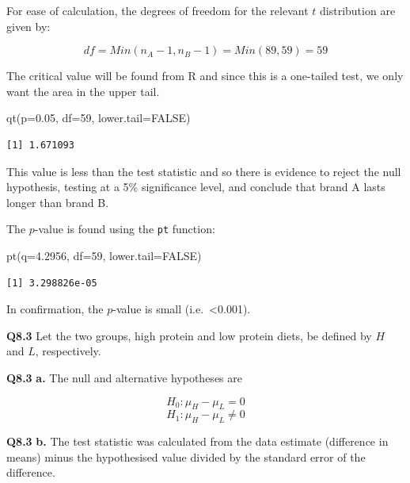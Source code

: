 \documentclass[
  oneside]{krantz}
\newenvironment{Shaded}{\begin{snugshade}}{\end{snugshade}}
\newcommand{\AttributeTok}[1]{\textcolor[rgb]{0.77,0.63,0.00}{#1}}
\newcommand{\ConstantTok}[1]{\textcolor[rgb]{0.00,0.00,0.00}{#1}}
\newcommand{\DecValTok}[1]{\textcolor[rgb]{0.00,0.00,0.81}{#1}}
\newcommand{\FloatTok}[1]{\textcolor[rgb]{0.00,0.00,0.81}{#1}}
\newcommand{\FunctionTok}[1]{\textcolor[rgb]{0.00,0.00,0.00}{#1}}
\newcommand{\NormalTok}[1]{#1}
\begin{document}
For ease of calculation, the degrees of freedom for the relevant \(t\) distribution are given by:

\[df = Min(n_A - 1, n_B - 1) = Min(89, 59) = 59\]

The critical value will be found from R and since this is a one-tailed test, we only want the area in the upper tail.

\begin{Shaded}
\begin{Highlighting}[]
\FunctionTok{qt}\NormalTok{(}\AttributeTok{p=}\FloatTok{0.05}\NormalTok{, }\AttributeTok{df=}\DecValTok{59}\NormalTok{, }\AttributeTok{lower.tail=}\ConstantTok{FALSE}\NormalTok{)}
\end{Highlighting}
\end{Shaded}

\begin{verbatim}
[1] 1.671093
\end{verbatim}

This value is less than the test statistic and so there is evidence to reject the null hypothesis, testing at a 5\% significance level, and conclude that brand A lasts longer than brand B.

The \(p\)-value is found using the \texttt{pt} function:

\begin{Shaded}
\begin{Highlighting}[]
\FunctionTok{pt}\NormalTok{(}\AttributeTok{q=}\FloatTok{4.2956}\NormalTok{, }\AttributeTok{df=}\DecValTok{59}\NormalTok{, }\AttributeTok{lower.tail=}\ConstantTok{FALSE}\NormalTok{)}
\end{Highlighting}
\end{Shaded}

\begin{verbatim}
[1] 3.298826e-05
\end{verbatim}

In confirmation, the \(p\)-value is small (i.e.~\textless0.001).

\textbf{Q8.3} Let the two groups, high protein and low protein diets, be defined by \(H\) and \(L\), respectively.

\textbf{Q8.3} \textbf{a.} The null and alternative hypotheses are

\[H_0: \mu_H - \mu_L = 0\]
\[H_1: \mu_H - \mu_L \ne 0\]

\textbf{Q8.3} \textbf{b.} The test statistic was calculated from the data estimate (difference in means) minus the hypothesised value divided by the standard error of the difference.
\end{document}
